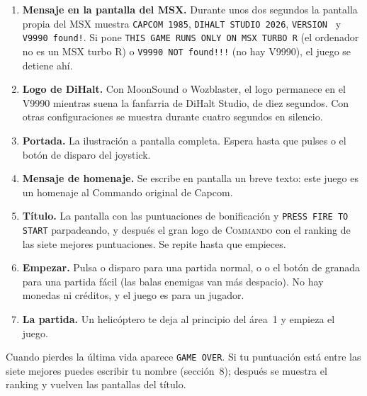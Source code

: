 \begin{enumerate}
\item \textbf{Mensaje en la pantalla del MSX.} Durante unos dos segundos la pantalla propia del MSX muestra
\texttt{CAPCOM 1985}, \texttt{DIHALT STUDIO 2026}, \texttt{VERSION \portVersion} y \texttt{V9990 found!}. Si pone \texttt{THIS GAME RUNS ONLY ON MSX TURBO
R} (el ordenador no es un MSX turbo R) o \texttt{V9990 NOT found!!!} (no hay V9990), el juego se detiene ahí.
\item \textbf{Logo de DiHalt.} Con MoonSound o Wozblaster, el logo permanece en el V9990 mientras suena la fanfarria de DiHalt Studio, de diez segundos. Con otras configuraciones se muestra durante cuatro segundos en silencio.
\item \textbf{Portada.} La ilustración a pantalla completa. Espera hasta que pulses  o el botón de disparo del
joystick.
\item \textbf{Mensaje de homenaje.} Se escribe en pantalla un breve texto: este juego es un homenaje al Commando original
de Capcom.
\item \textbf{Título.} La pantalla con las puntuaciones de bonificación y \texttt{PRESS FIRE TO START} parpadeando, y
después el gran logo de \textsc{Commando} con el ranking de las siete mejores puntuaciones. Se repite hasta que empieces.
\item \textbf{Empezar.} Pulsa  o disparo para una partida normal, o  o el botón de granada para una partida
fácil (las balas enemigas van más despacio). No hay monedas ni créditos, y el juego es para un jugador.
\item \textbf{La partida.} Un helicóptero te deja al principio del área~1 y empieza el juego.
\end{enumerate}

Cuando pierdes la última vida aparece \texttt{GAME OVER}. Si tu puntuación está entre las siete mejores puedes escribir tu
nombre (sección~8); después se muestra el ranking y vuelven las pantallas del título.

